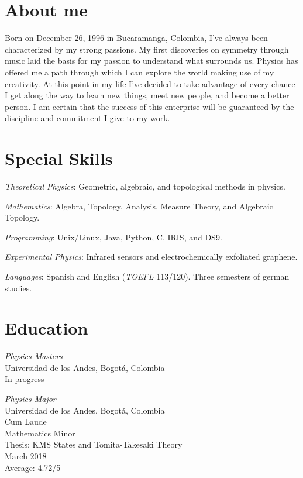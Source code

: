 \documentclass[line,margin]{res}
\begin{document}
\address{\href{mailto:ivanmbur@gmail.com}{ivanmbur@gmail.com}\\ Cr. 19 \# 63 27, Bogotá, Colombia\\ (+57) 316 782 1110}

\begin{resume}

\section{About me}

Born on December 26, 1996 in Bucaramanga, Colombia, I've always been characterized by my strong passions. My first discoveries on symmetry through music laid the basis for my passion to understand what surrounds us. Physics has offered me a path through which I can explore the world making use of my creativity. At this point in my life I've decided to take advantage of every chance I get along the way to learn new things, meet new people, and become a better person. I am certain that the success of this enterprise will be guaranteed by the discipline and commitment I give to my work. 

\section{Special Skills}

{\sl Theoretical Physics}: Geometric, algebraic, and topological methods in physics.

{\sl Mathematics}: Algebra, Topology, Analysis, Measure Theory, and Algebraic Topology.

{\sl Programming}: Unix/Linux, Java, Python, C, IRIS, and DS9.

{\sl Experimental Physics}: Infrared sensors and electrochemically exfoliated graphene. 

{\sl Languages}: Spanish and English ({\sl TOEFL} 113/120). Three semesters of german studies.

\section{Education}

{\sl Physics Masters\\}
Universidad de los Andes, Bogotá, Colombia \\
In progress

{\sl Physics Major\\}
Universidad de los Andes, Bogotá, Colombia \\
Cum Laude \\
Mathematics Minor \\
Thesis: KMS States and Tomita-Takesaki Theory \\
March 2018 \\
Average: 4.72/5


\end{resume}
\end{document}
